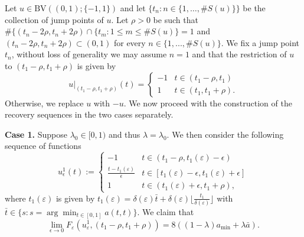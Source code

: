 \documentclass[12pt]{article}
\newcommand{\BV}{\mathrm{BV}}
\numberwithin{equation}{section}
\begin{document}
\smallskip
 Let $u\in\BV\left((0,1);\{-1,1\}\right)$ and let $\{t_{n}: n\in\{1,\ldots,\#S(u)
\}\}$ be the collection of jump points of $u$. Let $\rho>0$ be such that $\#\{(t_n-2\rho,t_n+2\rho)\cap\{t_m: 1\le m\le \#S(u)\}=1$ and $(t_n-2\rho,t_n+2\rho)
 \subset(0,1)$ for every $n\in\{1,...,\#S(u)\}$.  We fix a jump point $t_{n}$, without loss of generality we may assume $n=1$ and that the restriction of $u$ to $(t_{1}-\rho,t_{1}+\rho)$ is given by
\begin{equation*}
    u|_{(t_{1}-\rho,t_{1}+\rho)}(t)=
    \begin{cases}
     -1 & t\in(t_{1}-\rho,t_{1})\\
     1 & t\in(t_{1},t_{1}+\rho).
    \end{cases}
\end{equation*}
Otherwise, we replace $u$ with $-u$.  We now proceed with the construction of the recovery sequences in the two cases separately. 

\medskip
\noindent \textbf{Case 1.} Suppose $\lambda_{0}\in[0,1)$ and thus $\lambda=\lambda_{0}$. We then consider the following sequence of functions 
\begin{equation*}
    u^{1}_{\epsilon}(t):=
\begin{cases}
    -1 &t\in(t_{1}-\rho,t_{1}(\varepsilon)-\epsilon)\\
    \frac{t-t_{1}(\varepsilon)}{\epsilon}  &t\in[t_{1}(\varepsilon)-\epsilon,t_{1}(\varepsilon)+\epsilon]\\
    1 &t\in(t_{1}(\varepsilon)+\epsilon,t_{1}+\rho),
\end{cases}
\end{equation*}
where $t_{1}(\varepsilon)$ is given by $t_{1}(\varepsilon)=\delta(\varepsilon)\bar{t}+\delta(\varepsilon)\lfloor\frac{t_{1}}{\delta(\varepsilon)}\rfloor$ with $\bar{t}\in\{s:s=\arg\min_{t\in[0,1]} a(t,t)\}$. We claim that 
\begin{equation*}
    \lim_{\epsilon\to 0}F_{\varepsilon}(u^{1}_{\varepsilon},(t_{1}-\rho,t_{1}+\rho))=8\left((1-\lambda)a_{\min}+\lambda\bar{a}\right).
\end{equation*}
\end{document}
